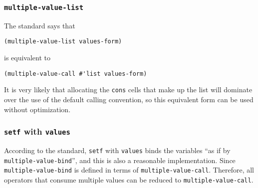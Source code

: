 \subsubsection{\texttt{multiple-value-list}}

The standard says that

\begin{verbatim}
(multiple-value-list values-form)
\end{verbatim}

is equivalent to

\begin{verbatim}
(multiple-value-call #'list values-form)
\end{verbatim}

It is very likely that allocating the \texttt{cons} cells that make up
the list will dominate over the use of the default calling convention,
so this equivalent form can be used without optimization. 

\subsubsection{\texttt{setf} with \texttt{values}}

According to the standard, \texttt{setf} with \texttt{values} binds
the variables ``as if by \texttt{multiple-value-bind}'', and this is
also a reasonable implementation.  Since \texttt{multiple-value-bind}
is defined in terms of \texttt{multiple-value-call}.  Therefore, all
operators that consume multiple values can be reduced to
\texttt{multiple-value-call}.

